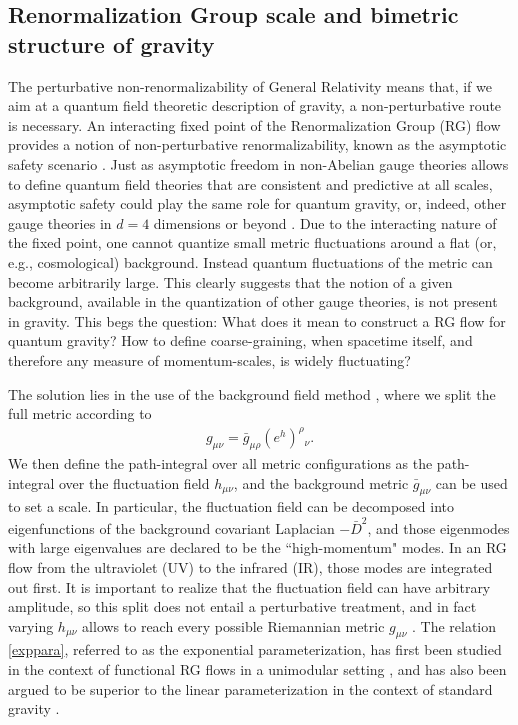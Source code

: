 \documentclass[11pt]{book} %
\begin{document}
\subsection{Renormalization Group scale and bimetric structure of gravity}
%
The perturbative non-renormalizability of General Relativity means that,
if we aim at a quantum field theoretic description of gravity, a non-perturbative route is necessary.
An interacting fixed point of the Renormalization Group (RG) flow provides a notion
of non-perturbative renormalizability, known as the asymptotic safety scenario \cite{Weinberg:1980gg}.
Just as asymptotic freedom in non-Abelian gauge theories allows to define quantum field theories that
are consistent and predictive at all scales,
asymptotic safety could play the same role for quantum gravity, or,
indeed, other gauge theories in $d=4$ dimensions \cite{Litim:2014uca, Litim:2015iea}
or beyond \cite{Gies:2003ic}.
Due to the interacting nature of the fixed point,
one cannot quantize small metric fluctuations around a flat (or, e.g., cosmological) background.
Instead quantum fluctuations of the metric can become arbitrarily large.
This clearly suggests that the notion of a given background,
available in the quantization of other gauge theories,
is not present in gravity. This begs the question:
What does it mean to construct a RG flow for quantum gravity?
How to define coarse-graining, when spacetime itself,
and therefore any measure of momentum-scales, is widely fluctuating?

The solution lies in the use of the background field method \cite{Abbott:1980hw},
where we split the full metric according to
\begin{align}
  g_{\mu\nu}=\bar g_{\mu\rho}(e^h)^\rho{}_\nu.
  \label{exppara}
\end{align}
We then define the path-integral over all metric configurations as the path-integral
over the fluctuation field $h_{\mu \nu}$,
and the background metric $\bar{g}_{\mu \nu}$ can be used to set a scale.
In particular, the fluctuation field can be decomposed into eigenfunctions of the background
covariant Laplacian $-\bar{D}^2$, and those eigenmodes with large eigenvalues are declared to
be the ``high-momentum" modes. In an RG flow from the ultraviolet (UV) to the infrared (IR),
those modes are integrated out first.
It is important to realize that the fluctuation field can have arbitrary amplitude,
so this split does not entail a perturbative treatment,
and in fact varying $h_{\mu \nu}$ allows to reach every possible Riemannian metric
$g_{\mu \nu}$ \cite{Demmel:2015zfa}.
The relation \eqref{exppara}, referred to as the exponential parameterization,
has first been studied in the context of functional RG flows in a unimodular
setting \cite{Eichhorn:2013xr,Eichhorn:2015bna},
and has also been argued to be superior to the linear parameterization in the
context of standard gravity \cite{Nink:2014yya, Percacci:2015wwa, Demmel:2015zfa,
Labus:2015ska, Ohta:2015efa, Gies:2015tca}.
\end{document}
